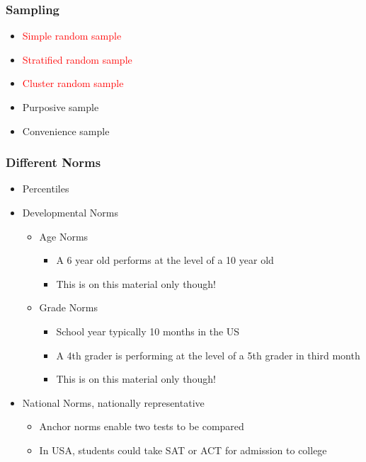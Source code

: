 \documentclass[dvipsnames]{beamer}\usepackage[]{graphicx}\usepackage[]{color}
\begin{document}
\begin{frame}
\frametitle{Sampling}
\begin{itemize}
\item \textcolor{red}{Simple random sample}
\item \textcolor{red}{Stratified random sample}
\item \textcolor{red}{Cluster random sample}
\item Purposive sample
\item Convenience sample
\end{itemize}
\end{frame}

\begin{frame}
\frametitle{Different Norms}
\begin{itemize}
\item Percentiles
\item Developmental Norms
  \begin{itemize}
  \item Age Norms
    \begin{itemize}
    \item A 6 year old performs at the level of a 10 year old
    \item This is on this material only though! 
    \end{itemize}
  \item Grade Norms
    \begin{itemize}
    \item School year typically 10 months in the US
    \item A 4th grader is performing at the level of a 5th grader in third month
    \item This is on this material only though!
    \end{itemize}
  \end{itemize}
\item National Norms, nationally representative
  \begin{itemize}
  \item Anchor norms enable two tests to be compared
  \item In USA, students could take SAT or ACT for admission to college
  \end{itemize}
\end{itemize}
\end{frame}
\end{document}
